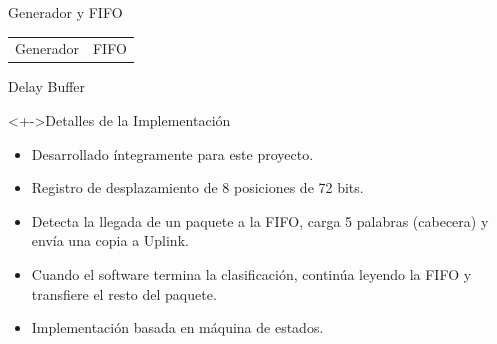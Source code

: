 \documentclass[xcolor=dvipsnames]{beamer}
\begin{document}
\begin{frame}{Generador y FIFO}
\begin{tabularx}{\linewidth}{VV}
      \\
      \tiny Generador
      &
      \tiny FIFO
      \\
    \end{tabularx}

\end{frame}


\begin{frame}{Delay Buffer}
 \begin{block}<+->{Detalles de la Implementación}
	\begin{itemize}
      \scriptsize
	\item Desarrollado íntegramente para este proyecto.
	\item Registro de desplazamiento de 8 posiciones de 72 bits.
	\item Detecta la llegada de un paquete a la FIFO, carga 5 palabras (cabecera) y envía una copia a Uplink.
	\item Cuando el software termina la clasificación, continúa leyendo la FIFO y transfiere el resto del paquete.
	\item Implementación basada en máquina de estados.


\end{itemize}
\end{block}
\end{frame}
\end{document}

